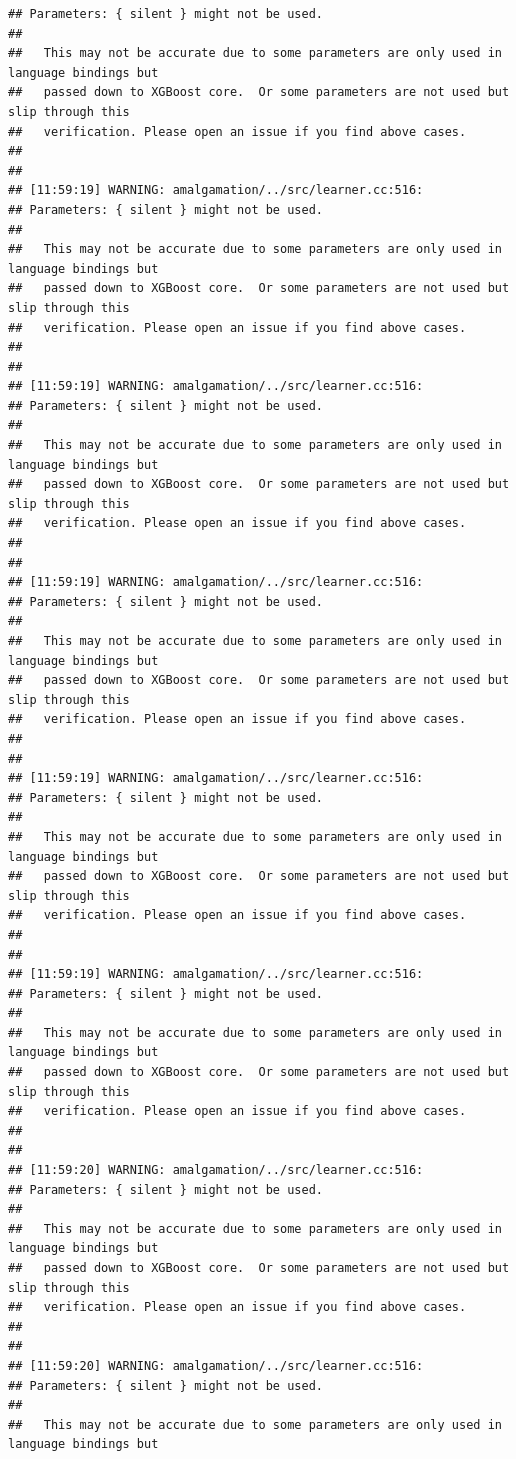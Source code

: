 \documentclass[AMS,STIX2COL]{WileyNJD-v2}\usepackage[]{graphicx}\usepackage[]{color}
\makeatletter
\newenvironment{kframe}{%
 \def\at@end@of@kframe{}%
 \ifinner\ifhmode%
  \def\at@end@of@kframe{\end{minipage}}%
  \begin{minipage}{\columnwidth}%
 \fi\fi%
 \def\FrameCommand##1{\hskip\@totalleftmargin \hskip-\fboxsep
 \colorbox{shadecolor}{##1}\hskip-\fboxsep
     \hskip-\linewidth \hskip-\@totalleftmargin \hskip\columnwidth}%
 \MakeFramed {\advance\hsize-\width
   \@totalleftmargin\z@ \linewidth\hsize
   \@setminipage}}%
 {\par\unskip\endMakeFramed%
 \at@end@of@kframe}
\newenvironment{knitrout}{}{} %
\makeatother
\begin{document}
\begin{knitrout}
\begin{kframe}
\begin{verbatim}
## Parameters: { silent } might not be used.
## 
##   This may not be accurate due to some parameters are only used in language bindings but
##   passed down to XGBoost core.  Or some parameters are not used but slip through this
##   verification. Please open an issue if you find above cases.
## 
## 
## [11:59:19] WARNING: amalgamation/../src/learner.cc:516: 
## Parameters: { silent } might not be used.
## 
##   This may not be accurate due to some parameters are only used in language bindings but
##   passed down to XGBoost core.  Or some parameters are not used but slip through this
##   verification. Please open an issue if you find above cases.
## 
## 
## [11:59:19] WARNING: amalgamation/../src/learner.cc:516: 
## Parameters: { silent } might not be used.
## 
##   This may not be accurate due to some parameters are only used in language bindings but
##   passed down to XGBoost core.  Or some parameters are not used but slip through this
##   verification. Please open an issue if you find above cases.
## 
## 
## [11:59:19] WARNING: amalgamation/../src/learner.cc:516: 
## Parameters: { silent } might not be used.
## 
##   This may not be accurate due to some parameters are only used in language bindings but
##   passed down to XGBoost core.  Or some parameters are not used but slip through this
##   verification. Please open an issue if you find above cases.
## 
## 
## [11:59:19] WARNING: amalgamation/../src/learner.cc:516: 
## Parameters: { silent } might not be used.
## 
##   This may not be accurate due to some parameters are only used in language bindings but
##   passed down to XGBoost core.  Or some parameters are not used but slip through this
##   verification. Please open an issue if you find above cases.
## 
## 
## [11:59:19] WARNING: amalgamation/../src/learner.cc:516: 
## Parameters: { silent } might not be used.
## 
##   This may not be accurate due to some parameters are only used in language bindings but
##   passed down to XGBoost core.  Or some parameters are not used but slip through this
##   verification. Please open an issue if you find above cases.
## 
## 
## [11:59:20] WARNING: amalgamation/../src/learner.cc:516: 
## Parameters: { silent } might not be used.
## 
##   This may not be accurate due to some parameters are only used in language bindings but
##   passed down to XGBoost core.  Or some parameters are not used but slip through this
##   verification. Please open an issue if you find above cases.
## 
## 
## [11:59:20] WARNING: amalgamation/../src/learner.cc:516: 
## Parameters: { silent } might not be used.
## 
##   This may not be accurate due to some parameters are only used in language bindings but

\end{verbatim}
\end{kframe}
\end{knitrout}
\end{document}
